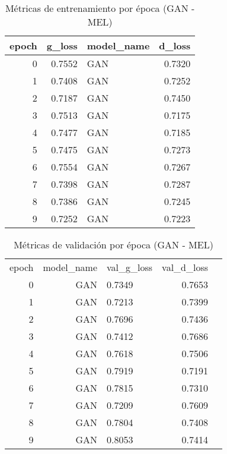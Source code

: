 \begin{table}
\centering
\caption{Métricas de entrenamiento por época (GAN - MEL)}
\label{tab:gan_mel_train_epoch}
\begin{tabular}{rrlr}
\toprule
 epoch &  g\_loss & model\_name &  d\_loss \\
\midrule
     0 &  0.7552 &        GAN &  0.7320 \\
     1 &  0.7408 &        GAN &  0.7252 \\
     2 &  0.7187 &        GAN &  0.7450 \\
     3 &  0.7513 &        GAN &  0.7175 \\
     4 &  0.7477 &        GAN &  0.7185 \\
     5 &  0.7475 &        GAN &  0.7273 \\
     6 &  0.7554 &        GAN &  0.7267 \\
     7 &  0.7398 &        GAN &  0.7287 \\
     8 &  0.7386 &        GAN &  0.7245 \\
     9 &  0.7252 &        GAN &  0.7223 \\
\bottomrule
\end{tabular}
\end{table}


\begin{table}
\centering
\caption{Métricas de validación por época (GAN - MEL)}
\label{tab:gan_mel_val_epoch}
\begin{tabular}{rrlrr}
\toprule
 epoch &  model\_name &  val\_g\_loss &  val\_d\_loss \\
     0 &       GAN &      0.7349 &      0.7653 \\
     1 &       GAN &      0.7213 &      0.7399 \\
     2 &       GAN &      0.7696 &      0.7436 \\
     3 &       GAN &      0.7412 &      0.7686 \\
     4 &       GAN &      0.7618 &      0.7506 \\
     5 &       GAN &      0.7919 &      0.7191 \\
     6 &       GAN &      0.7815 &      0.7310 \\
     7 &       GAN &      0.7209 &      0.7609 \\
     8 &       GAN &      0.7804 &      0.7408 \\
     9 &       GAN &      0.8053 &      0.7414 \\
\bottomrule
\end{tabular}
\end{table}


